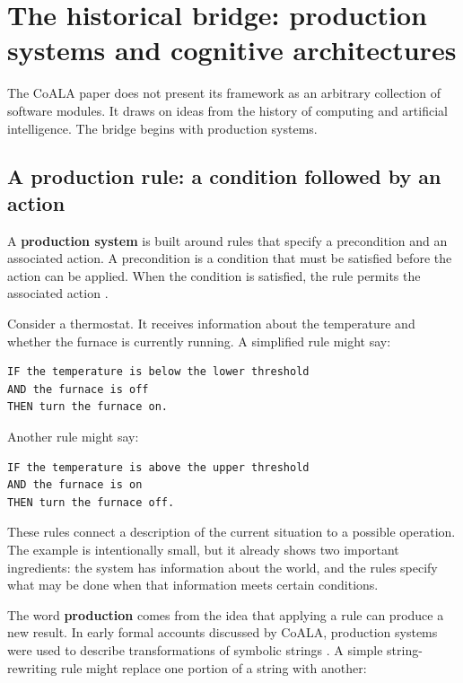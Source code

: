 \section{The historical bridge: production systems and cognitive architectures}\label{the-historical-bridge-production-systems-and-cognitive-architectures}

The CoALA paper does not present its framework as an arbitrary collection of software modules. It draws on ideas from the history of computing and artificial intelligence. The bridge begins with production systems.

\subsection{A production rule: a condition followed by an action}\label{a-production-rule-a-condition-followed-by-an-action}

A \textbf{production system} is built around rules that specify a precondition and an associated action. A precondition is a condition that must be satisfied before the action can be applied. When the condition is satisfied, the rule permits the associated action .

Consider a thermostat. It receives information about the temperature and whether the furnace is currently running. A simplified rule might say:

\begin{lstlisting}
IF the temperature is below the lower threshold
AND the furnace is off
THEN turn the furnace on.
\end{lstlisting}

Another rule might say:

\begin{lstlisting}
IF the temperature is above the upper threshold
AND the furnace is on
THEN turn the furnace off.
\end{lstlisting}

These rules connect a description of the current situation to a possible operation. The example is intentionally small, but it already shows two important ingredients: the system has information about the world, and the rules specify what may be done when that information meets certain conditions.

The word \textbf{production} comes from the idea that applying a rule can produce a new result. In early formal accounts discussed by CoALA, production systems were used to describe transformations of symbolic strings . A simple string-rewriting rule might replace one portion of a string with another:

